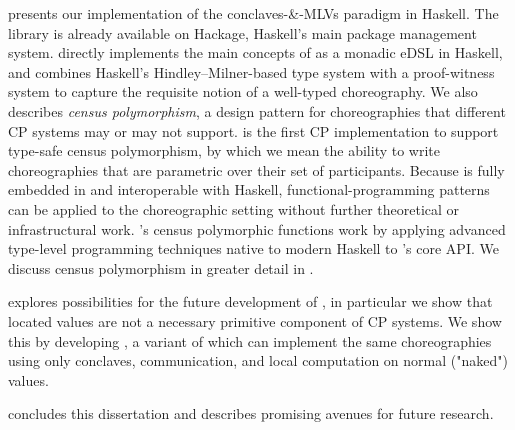 presents our implementation of the conclaves-\&-MLVs paradigm in Haskell.
The \MultiChor library is already available on Hackage, Haskell's main package management system.
\MultiChor directly implements the main concepts of \HLSCentral as a monadic eDSL in Haskell,
and combines Haskell's Hindley–Milner-based type system with a proof-witness system
to capture the requisite notion of a well-typed choreography.
We also describes \emph{census polymorphism},
a design pattern for choreographies that different CP systems may or may not support.
\MultiChor is the first CP implementation to support type-safe census polymorphism,
by which we mean the ability to write choreographies
that are parametric over their set of participants.
Because \MultiChor is fully embedded in and interoperable with Haskell,
functional-programming patterns can be applied to the choreographic setting without further theoretical or infrastructural work.
\MultiChor's census polymorphic functions work by applying advanced type-level programming techniques native to modern Haskell
to \MultiChor's core API.
We discuss census polymorphism in greater detail in .

 explores possibilities for the future development of \MultiChor,
in particular we show that located values are not a necessary primitive component of CP systems.
We show this
by developing \minichor,
a variant of \MultiChor which can implement the same choreographies using only conclaves, communication, and local computation on normal ("naked") values.

 concludes this dissertation and describes promising avenues for future research.

